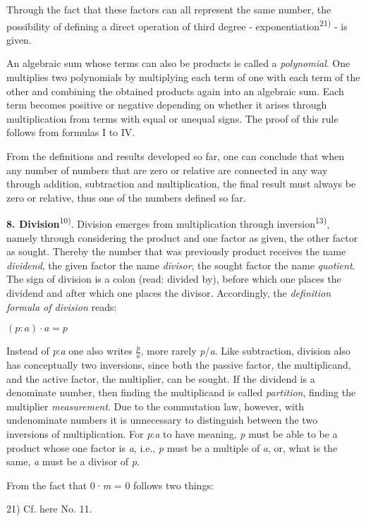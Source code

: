 \thispagestyle{fancy}

\vspace{0.5cm}

Through the fact that these factors can all represent the same number, the possibility of defining a direct operation of third degree - exponentiation\textsuperscript{21)} - is given.

An algebraic sum whose terms can also be products is called a \textit{polynomial}. One multiplies two polynomials by multiplying each term of one with each term of the other and combining the obtained products again into an algebraic sum. Each term becomes positive or negative depending on whether it arises through multiplication from terms with equal or unequal signs. The proof of this rule follows from formulas I to IV.

From the definitions and results developed so far, one can conclude that when any number of numbers that are zero or relative are connected in any way through addition, subtraction and multiplication, the final result must always be zero or relative, thus one of the numbers defined so far.

\vspace{0.5cm}

\textbf{8. Division}\textsuperscript{10)}. Division emerges from multiplication through inversion\textsuperscript{13)}, namely through considering the product and one factor as given, the other factor as sought. Thereby the number that was previously product receives the name \textit{dividend}, the given factor the name \textit{divisor}, the sought factor the name \textit{quotient}. The sign of division is a colon (read: divided by), before which one places the dividend and after which one places the divisor. Accordingly, the \textit{definition formula of division} reads:

\begin{center}
$(p:a) \cdot a = p$
\end{center}

Instead of \textit{p}:\textit{a} one also writes $\frac{p}{a}$, more rarely \textit{p}/\textit{a}. Like subtraction, division also has conceptually two inversions, since both the passive factor, the multiplicand, and the active factor, the multiplier, can be sought. If the dividend is a denominate number, then finding the multiplicand is called \textit{partition}, finding the multiplier \textit{measurement}. Due to the commutation law, however, with undenominate numbers it is unnecessary to distinguish between the two inversions of multiplication. For \textit{p}:\textit{a} to have meaning, \textit{p} must be able to be a product whose one factor is \textit{a}, i.e., \textit{p} must be a multiple of \textit{a}, or, what is the same, \textit{a} must be a divisor of \textit{p}. 

From the fact that 0·\textit{m} = 0 follows two things: \hfill

\vfill
\leftline{\rule{2in}{0.4pt}}
\vspace{0.2cm}
{
\footnotesize
21) Cf. here No. 11.

}
